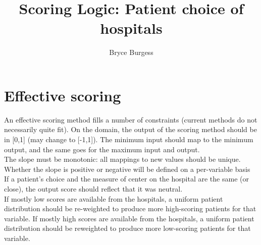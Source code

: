 \documentclass{amsart}
\title{Scoring Logic: Patient choice of hospitals}
\author{Bryce Burgess}
\date{}
\begin{document}
\maketitle

\section{Effective scoring}
An effective scoring method fills a number of constraints (current methods do not necessarily quite fit). On the domain, the output of the scoring method should be in [0,1] (may change to [-1,1]). The minimum input should map to the minimum output, and the same goes for the maximum input and output. \\

The slope must be monotonic: all mappings to new values should be unique. Whether the slope is positive or negative will be defined on a per-variable basis \\

If a patient's choice and the measure of center on the hospital are the same (or close), the output score should reflect that it was neutral. \\

If mostly low scores are available from the hospitals, a uniform patient distribution should be re-weighted to produce more high-scoring patients for that variable. If mostly high scores are available from the hospitals, a uniform patient distribution should be reweighted to produce more low-scoring patients for that variable. 
\end{document}
